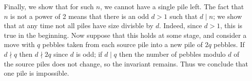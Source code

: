 \documentclass[11pt,a4paper]{article}
\begin{document}
\begin{enumerate}
        Finally, we show that for such $n$, we cannot have a single pile left. 
        The fact that $n$ is not a power of 2 means that there is an odd $d > 1$ such that $d\mid n$; 
        we show that at any time not all piles have size divisble by $d$. 
        Indeed, since $d > 1$, this is true in the beginning. 
        Now suppose that this holds at some stage, 
        and consider a move with $q$ pebbles taken from each source pile into a new pile of $2q$ pebbles. 
        If $d\nmid q$ then $d\nmid 2q$ since $d$ is odd; 
        if $d\mid q$ then the number of pebbles modulo $d$ of the source piles does not change, 
        so the invariant remains. 
        Thus we conclude that one pile is impossible. 
    	
    \end{enumerate}
    
\end{document}
